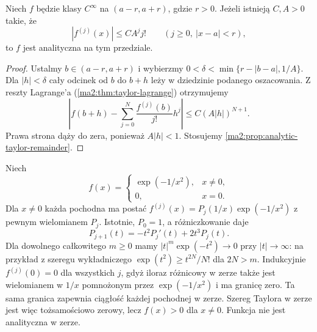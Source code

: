\begin{twierdzenie}
\label{ma2:thm:analytic-derivative-bound}
Niech $f$ będzie klasy $C^\infty$
na $(a-r,a+r)$, gdzie $r>0$.
Jeżeli istnieją $C,A>0$ takie, że
\[
 |f^{(j)}(x)|\le C A^j j!
 \qquad (j\ge0,\ |x-a|<r),
\]
to $f$ jest analityczna na tym przedziale.
\end{twierdzenie}
\begin{proof}
Ustalmy $b\in(a-r,a+r)$ i wybierzmy
$0<\delta<\min\{r-|b-a|,1/A\}$.
Dla $|h|<\delta$ cały odcinek od $b$ do $b+h$
leży w dziedzinie podanego oszacowania.
Z reszty Lagrange'a
(\ref{ma2:thm:taylor-lagrange}) otrzymujemy
\[
 \left|f(b+h)-\sum_{j=0}^N
 \frac{f^{(j)}(b)}{j!}h^j\right|
 \le C(A|h|)^{N+1}.
\]
Prawa strona dąży do zera, ponieważ $A|h|<1$.
Stosujemy \ref{ma2:prop:analytic-taylor-remainder}.
\end{proof}

\begin{przyklad}
\label{ma2:ex:analytic-flat}
Niech
\[
 f(x)=
 \begin{cases}
 \exp(-1/x^2),&x\ne0,\\
 0,&x=0.
 \end{cases}
\]
Dla $x\ne0$ każda pochodna ma postać
$f^{(j)}(x)=P_j(1/x)\exp(-1/x^2)$
z pewnym wielomianem $P_j$.
Istotnie, $P_0=1$, a różniczkowanie daje
\[
 P_{j+1}(t)=-t^2 P_j'(t)+2t^3P_j(t).
\]
Dla dowolnego całkowitego $m\ge0$
mamy $|t|^m\exp(-t^2)\to0$ przy $|t|\to\infty$:
na przykład z szeregu wykładniczego
$\exp(t^2)\ge t^{2N}/N!$ dla $2N>m$.
Indukcyjnie $f^{(j)}(0)=0$ dla wszystkich $j$,
gdyż iloraz różnicowy w zerze także jest
wielomianem w $1/x$ pomnożonym przez
$\exp(-1/x^2)$ i ma granicę zero.
Ta sama granica zapewnia ciągłość każdej
pochodnej w zerze.
Szereg Taylora w zerze jest więc tożsamościowo
zerowy, lecz $f(x)>0$ dla $x\ne0$.
Funkcja nie jest analityczna w zerze.
\end{przyklad}

